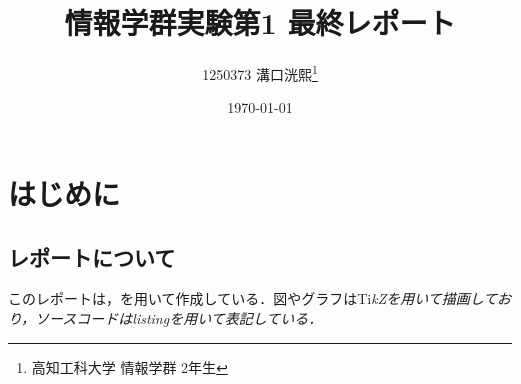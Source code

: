 \documentclass[a4j,11pt]{jsarticle}
\title{\vspace{0cm}情報学群実験第1 最終レポート}
\author{1250373 溝口洸熙\thanks{高知工科大学 情報学群 2年生}}
\date{\today}
\begin{document}
\maketitle

\begin{abstract}

\end{abstract}
\tableofcontents
\newpage
\section*{はじめに}
\subsection*{レポートについて}
このレポートは，\LaTeXe を用いて作成している．図やグラフはTi\it{k}\normalfont Zを用いて描画しており，ソースコードはlistingを用いて表記している．
\end{document}
